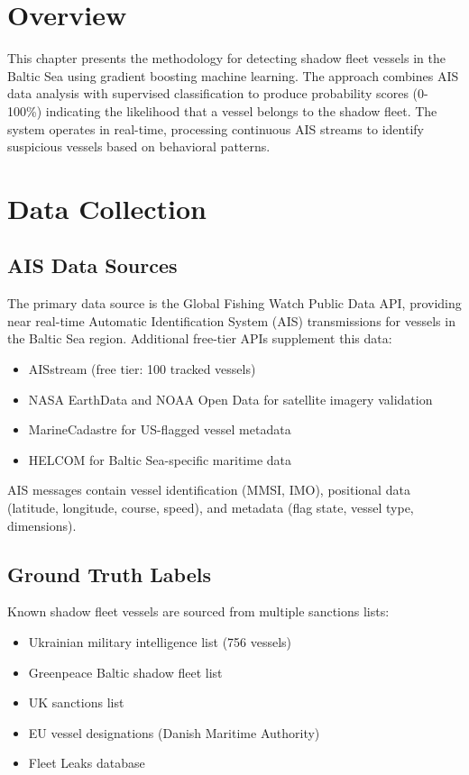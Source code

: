 
\section{Overview}
This chapter presents the methodology for detecting shadow fleet vessels in the Baltic Sea using gradient boosting machine learning. The approach combines AIS data analysis with supervised classification to produce probability scores (0-100\%) indicating the likelihood that a vessel belongs to the shadow fleet. The system operates in real-time, processing continuous AIS streams to identify suspicious vessels based on behavioral patterns.

\section{Data Collection}

\subsection{AIS Data Sources}
The primary data source is the Global Fishing Watch Public Data API, providing near real-time Automatic Identification System (AIS) transmissions for vessels in the Baltic Sea region. Additional free-tier APIs supplement this data:
\begin{itemize}
    \item AISstream (free tier: 100 tracked vessels)
    \item NASA EarthData and NOAA Open Data for satellite imagery validation
    \item MarineCadastre for US-flagged vessel metadata
    \item HELCOM for Baltic Sea-specific maritime data
\end{itemize}

AIS messages contain vessel identification (MMSI, IMO), positional data (latitude, longitude, course, speed), and metadata (flag state, vessel type, dimensions).

\subsection{Ground Truth Labels}
Known shadow fleet vessels are sourced from multiple sanctions lists:
\begin{itemize}
    \item Ukrainian military intelligence list (756 vessels)
    \item Greenpeace Baltic shadow fleet list
    \item UK sanctions list
    \item EU vessel designations (Danish Maritime Authority)
    \item Fleet Leaks database
\end{itemize}

